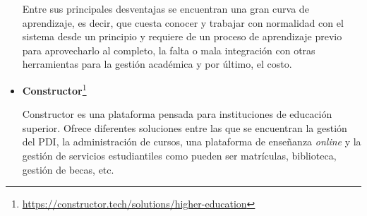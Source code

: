 \begin{itemize}
Entre sus principales desventajas se encuentran una gran curva de aprendizaje, es decir, que cuesta conocer y trabajar con normalidad con el sistema desde un principio y requiere de un proceso de aprendizaje previo para aprovecharlo al completo, la falta o mala integración con otras herramientas para la gestión académica y por último, el costo.

\item \textbf{Constructor}\footnote{\url{https://constructor.tech/solutions/higher-education}}

Constructor es una plataforma pensada para instituciones de educación superior.
Ofrece diferentes soluciones entre las que se encuentran la gestión del PDI, la administración de cursos, una plataforma de enseñanza \textit{online} y la gestión de servicios estudiantiles como pueden ser matrículas, biblioteca, gestión de becas, etc.


\end{itemize}
